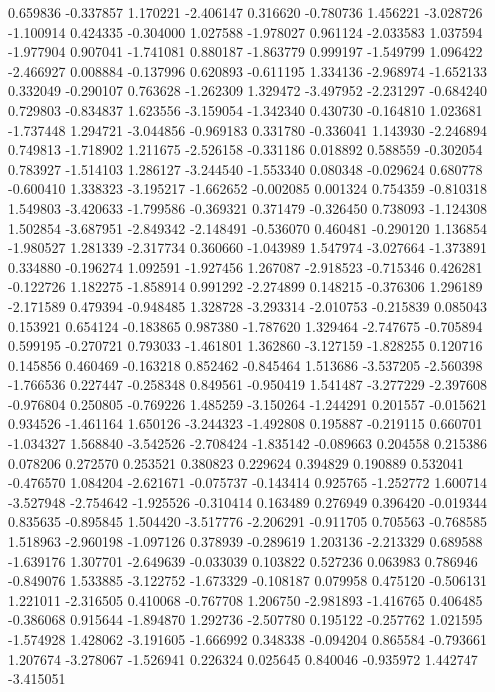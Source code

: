 0.659836
-0.337857
1.170221
-2.406147
0.316620
-0.780736
1.456221
-3.028726
-1.100914
0.424335
-0.304000
1.027588
-1.978027
0.961124
-2.033583
1.037594
-1.977904
0.907041
-1.741081
0.880187
-1.863779
0.999197
-1.549799
1.096422
-2.466927
0.008884
-0.137996
0.620893
-0.611195
1.334136
-2.968974
-1.652133
0.332049
-0.290107
0.763628
-1.262309
1.329472
-3.497952
-2.231297
-0.684240
0.729803
-0.834837
1.623556
-3.159054
-1.342340
0.430730
-0.164810
1.023681
-1.737448
1.294721
-3.044856
-0.969183
0.331780
-0.336041
1.143930
-2.246894
0.749813
-1.718902
1.211675
-2.526158
-0.331186
0.018892
0.588559
-0.302054
0.783927
-1.514103
1.286127
-3.244540
-1.553340
0.080348
-0.029624
0.680778
-0.600410
1.338323
-3.195217
-1.662652
-0.002085
0.001324
0.754359
-0.810318
1.549803
-3.420633
-1.799586
-0.369321
0.371479
-0.326450
0.738093
-1.124308
1.502854
-3.687951
-2.849342
-2.148491
-0.536070
0.460481
-0.290120
1.136854
-1.980527
1.281339
-2.317734
0.360660
-1.043989
1.547974
-3.027664
-1.373891
0.334880
-0.196274
1.092591
-1.927456
1.267087
-2.918523
-0.715346
0.426281
-0.122726
1.182275
-1.858914
0.991292
-2.274899
0.148215
-0.376306
1.296189
-2.171589
0.479394
-0.948485
1.328728
-3.293314
-2.010753
-0.215839
0.085043
0.153921
0.654124
-0.183865
0.987380
-1.787620
1.329464
-2.747675
-0.705894
0.599195
-0.270721
0.793033
-1.461801
1.362860
-3.127159
-1.828255
0.120716
0.145856
0.460469
-0.163218
0.852462
-0.845464
1.513686
-3.537205
-2.560398
-1.766536
0.227447
-0.258348
0.849561
-0.950419
1.541487
-3.277229
-2.397608
-0.976804
0.250805
-0.769226
1.485259
-3.150264
-1.244291
0.201557
-0.015621
0.934526
-1.461164
1.650126
-3.244323
-1.492808
0.195887
-0.219115
0.660701
-1.034327
1.568840
-3.542526
-2.708424
-1.835142
-0.089663
0.204558
0.215386
0.078206
0.272570
0.253521
0.380823
0.229624
0.394829
0.190889
0.532041
-0.476570
1.084204
-2.621671
-0.075737
-0.143414
0.925765
-1.252772
1.600714
-3.527948
-2.754642
-1.925526
-0.310414
0.163489
0.276949
0.396420
-0.019344
0.835635
-0.895845
1.504420
-3.517776
-2.206291
-0.911705
0.705563
-0.768585
1.518963
-2.960198
-1.097126
0.378939
-0.289619
1.203136
-2.213329
0.689588
-1.639176
1.307701
-2.649639
-0.033039
0.103822
0.527236
0.063983
0.786946
-0.849076
1.533885
-3.122752
-1.673329
-0.108187
0.079958
0.475120
-0.506131
1.221011
-2.316505
0.410068
-0.767708
1.206750
-2.981893
-1.416765
0.406485
-0.386068
0.915644
-1.894870
1.292736
-2.507780
0.195122
-0.257762
1.021595
-1.574928
1.428062
-3.191605
-1.666992
0.348338
-0.094204
0.865584
-0.793661
1.207674
-3.278067
-1.526941
0.226324
0.025645
0.840046
-0.935972
1.442747
-3.415051
